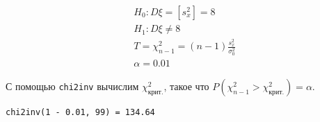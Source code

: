 \documentclass{report}
\begin{document}
\begin{equation*}
\begin{split}
&H_0 : D\xi = [s^2_x] = 8 \\
&H_1 : D\xi \ne 8 \\ 
&T = \chi^2_{n-1} = \left(n-1\right)\frac{s^2_x}{\sigma^2_0} \\
&\alpha = 0.01
\end{split}
\end{equation*}

С помощью \lstinline{chi2inv} вычислим $\chi^2_{\text{крит.}}$, такое что $P\left( \chi^2_{n-1} > \chi^2_{\text{крит.}} \right) = \alpha$. 

\begin{lstlisting}
chi2inv(1 - 0.01, 99) = 134.64
\end{lstlisting}





\end{document}
